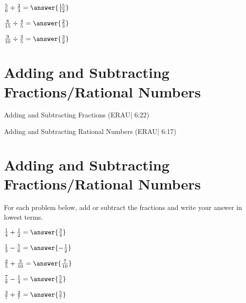 \documentclass{ximera}
\begin{document}
\begin{problem}
$\frac{5}{6} \div \frac{2}{3} = \answer{\frac{15}{12}}$
\end{problem}

\begin{problem}
$\frac{8}{15} \div \frac{4}{5} = \answer{\frac{2}{3}}$
\end{problem}

\begin{problem}
$\frac{9}{10} \div \frac{3}{5} = \answer{\frac{3}{2}}$
\end{problem}


\section*{Adding and Subtracting Fractions/Rational Numbers}

Adding and Subtracting Fractions (ERAU| 6:22)


Adding and Subtracting Rational Numbers (ERAU| 6:17)



\section*{Adding and Subtracting Fractions/Rational Numbers}

For each problem below, add or subtract the fractions and write your answer in lowest terms.

\begin{problem}
$\frac{1}{4} + \frac{1}{2} = \answer{\frac{3}{4}}$
\end{problem}

\begin{problem}
$\frac{1}{3} - \frac{5}{6} = \answer{-\frac{1}{2}}$
\end{problem}

\begin{problem}
$\frac{2}{5} + \frac{3}{10} = \answer{\frac{7}{10}}$
\end{problem}

\begin{problem}
$\frac{7}{8} - \frac{1}{4} = \answer{\frac{5}{8}}$
\end{problem}

\begin{problem}
$\frac{3}{7} + \frac{2}{7} = \answer{\frac{5}{7}}$
\end{problem}
\end{document}
